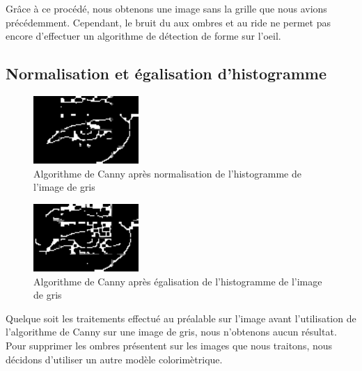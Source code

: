 Grâce à ce procédé, nous obtenons une image sans la grille que nous avions précédemment. Cependant,
le bruit du aux ombres et au ride ne permet pas encore d'effectuer un algorithme de détection de forme
sur l'oeil.



\subsection{Normalisation et égalisation d'histogramme}

\begin{figure}[H]
 \center
 \includegraphics[width=4cm]{image/normalisation.png}
 \caption{Algorithme de Canny après normalisation de l'histogramme de l'image de gris}
\end{figure}

\begin{figure}[H]
 \center
 \includegraphics[width=4cm]{image/egalisationHist.png}
 \caption{Algorithme de Canny après égalisation de l'histogramme de l'image de gris}
\end{figure}

Quelque soit les traitements effectué au préalable sur l'image avant l'utilisation de l'algorithme de Canny
sur une image de gris, nous n'obtenons aucun résultat. Pour supprimer les ombres présentent sur les images
que nous traitons, nous décidons d'utiliser un autre modèle colorimètrique.

